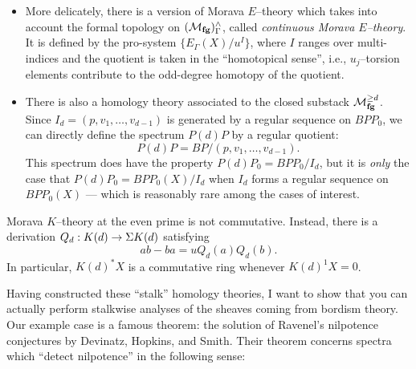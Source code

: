 \begin{definition}
\begin{itemize}
\item More delicately, there is a version of Morava $E$--theory which takes into account the formal topology on $(\mathcal{M}_{\mathbf{fg}})^\wedge_\Gamma$, called \textit{continuous Morava $E$--theory}.  It is defined by the pro-system $\{E_\Gamma(X) / u^I\}$, where $I$ ranges over multi-indices and the quotient is taken in the ``homotopical sense'', i.e., $u_j$--torsion elements contribute to the odd-degree homotopy of the quotient.
\item There is also a homology theory associated to the closed substack $\mathcal{M}_{\mathbf{fg}}^{\ge d}$.  Since $I_d = (p, v_1, \ldots, v_{d-1})$ is generated by a regular sequence on $BPP_0$, we can directly define the spectrum $P(d)P$ by a regular quotient: \[P(d)P = BP / (p, v_1, \ldots, v_{d-1}).\]  This spectrum does have the property $P(d)P_0 = BPP_0 / I_d$, but it is \emph{only} the case that $P(d)P_0 = BPP_0(X) / I_d$ when $I_d$ forms a regular sequence on $BPP_0(X)$ --- which is reasonably rare among the cases of interest.
\end{itemize}
\end{definition}

\begin{remark}\label{MoravaKIsNotCommutative}
Morava $K$--theory at the even prime is not commutative.  Instead, there is a derivation $Q_d: K(d) \to \Sigma K(d)$ satisfying \[ab - ba = u Q_d(a) Q_d(b).\]  In particular, $K(d)^* X$ is a commutative ring whenever $K(d)^1 X = 0$.
\end{remark}




Having constructed these ``stalk'' homology theories, I want to show that you can actually perform stalkwise analyses of the sheaves coming from bordism theory.  Our example case is a famous theorem: the solution of Ravenel's nilpotence conjectures by Devinatz, Hopkins, and Smith.  Their theorem concerns spectra which ``detect nilpotence'' in the following sense:


